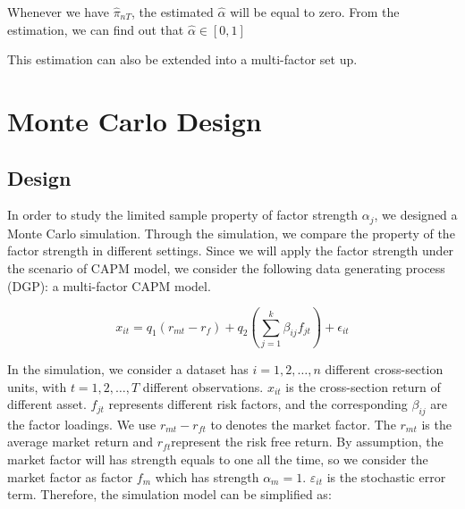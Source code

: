 \documentclass[12pt]{article}
\begin{document}
Whenever we have $\hat{\pi}_{nT}$, the estimated $\hat{\alpha}$ will be equal to zero. 
From the estimation, we can find out that $\hat{\alpha} \in [0,1]$



This estimation can also be extended into a multi-factor set up.



	\section{Monte Carlo Design}\label{MC}
	\subsection{Design}
In order to study the limited sample property of factor strength $\alpha_j$, we designed a Monte Carlo simulation.
Through the simulation, we compare the property of the factor strength in different settings.
Since we will apply the factor strength under the scenario of CAPM model, we consider the following data generating process (DGP): a multi-factor CAPM model.

\[ x_{it} = q_1({r_{mt}} - r_f) + q_2( \sum_{j=1}^k\beta_{ij}f_{jt}) +\epsilon_{it}  \]


In the simulation, we consider a dataset has $i = 1, 2,\dots, n$ different cross-section units, with $t= 1, 2,\dots, T$ different observations. 
$x_{it}$ is the cross-section return of different asset.
$f_{jt}$ represents different risk factors, and the corresponding  $\beta_{ij}$ are the factor loadings.
We use $r_{mt} - r_{ft}$ to denotes the market factor.
The $r_{mt}$ is the average market return and $r_{ft}$represent the risk free return.
By assumption, the market factor will has strength equals to one all the time, so we consider the market factor as factor $f_{m}$ which has strength $\alpha_m = 1$.
$\varepsilon_{it}$ is the stochastic error term.
Therefore, the simulation model can be simplified as:
\end{document}
